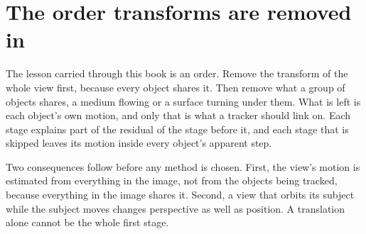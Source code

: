 \section{The order transforms are removed in}

The lesson carried through this book is an order. Remove the transform of the whole view first,
because every object shares it. Then remove what a group of objects shares, a medium flowing or a
surface turning under them. What is left is each object's own motion, and only that is what a
tracker should link on. Each stage explains part of the residual of the stage before it, and each
stage that is skipped leaves its motion inside every object's apparent step.

Two consequences follow before any method is chosen. First, the view's motion is estimated from
everything in the image, not from the objects being tracked, because everything in the image shares
it. Second, a view that orbits its subject while the subject moves changes perspective as well as
position. A translation alone cannot be the whole first stage.
